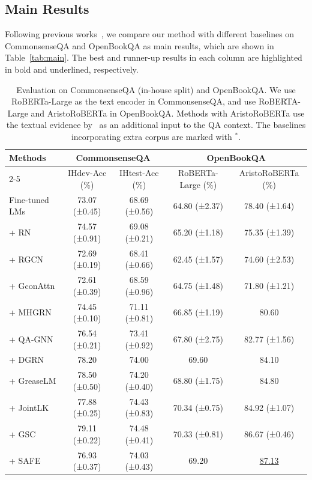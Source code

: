 \documentclass[runningheads]{llncs}
\begin{document}
\subsection{Main Results}
Following previous works~\cite{ref:qagnn,ref:gsc,ref:safe,ref:mvp}, we compare our method with different baselines on CommonsenseQA and OpenBookQA as main results, which are shown in Table~\ref{tab:main}. The best and runner-up results in each column are highlighted in bold and underlined, respectively.
\begin{table}[t!]
  \centering
  \caption{Evaluation on CommonsenseQA (in-house split) and OpenBookQA. We use RoBERTa-Large as the text encoder in CommonsenseQA, and use RoBERTA-Large and AristoRoBERTa in OpenBookQA. Methods with AristoRoBERTa use the textual evidence by~\cite{ref:aristo} as an additional input to the QA context. The baselines incorporating extra corpus are marked with $^*$.}
  \resizebox{0.9\linewidth}{!} {
    \begin{tabular}{l|cc|cc}
    \toprule
    \multicolumn{1}{l|}{\multirow{2}[3]{*}{Methods}} & \multicolumn{2}{c|}{CommonsenseQA} & \multicolumn{2}{c}{OpenBookQA} \\
\cmidrule{2-5}          & IHdev-Acc (\%) & IHtest-Acc (\%) & RoBERTa-Large (\%) & AristoRoBERTa (\%) \\
    \midrule
    Fine-tuned LMs & 73.07 (±0.45) & 68.69 (±0.56) & 64.80 (±2.37) & 78.40 (±1.64) \\
    \midrule
    + RN  & 74.57 (±0.91) & 69.08 (±0.21) & 65.20 (±1.18) & 75.35 (±1.39) \\
    + RGCN & 72.69 (±0.19) & 68.41 (±0.66) & 62.45 (±1.57)  & 74.60 (±2.53) \\
    + GconAttn & 72.61 (±0.39) & 68.59 (±0.96) & 64.75 (±1.48) & 71.80 (±1.21) \\
    + MHGRN & 74.45 (±0.10) & 71.11 (±0.81) & 66.85 (±1.19) & 80.60 \\
    + QA-GNN & 76.54 (±0.21) & 73.41 (±0.92) & 67.80 (±2.75) & 82.77 (±1.56) \\
    + DGRN & 78.20  & 74.00    & 69.60  & 84.10 \\
    + GreaseLM & 78.50 (±0.50) & 74.20 (±0.40) & 68.80 (±1.75) & 84.80 \\
    + JointLK & 77.88 (±0.25) & 74.43 (±0.83) & 70.34 (±0.75) & 84.92 (±1.07) \\
    + GSC & 79.11 (±0.22) & 74.48 (±0.41) & 70.33 (±0.81) & 86.67 (±0.46) \\
    + SAFE & 76.93 (±0.37) & 74.03 (±0.43) & 69.20  & \underline{87.13} \\

\end{tabular}}
\end{table}
\end{document}
